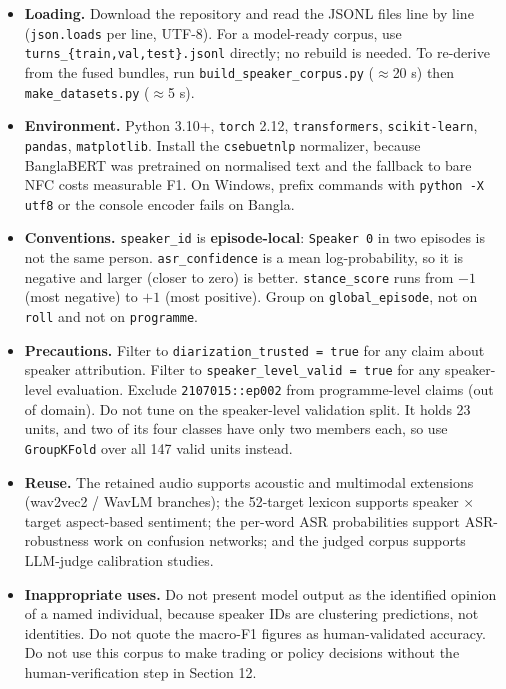 \documentclass[11pt,a4paper]{article}
\begin{document}
\begin{itemize}[leftmargin=1.4em,itemsep=3pt,topsep=2pt]
  \item \textbf{Loading.} Download the repository and read the JSONL files line by line
        (\texttt{json.loads} per line, UTF-8). For a model-ready corpus, use
        \texttt{turns\_\{train,val,test\}.jsonl} directly; no rebuild is needed. To re-derive
        from the fused bundles, run \texttt{build\_speaker\_corpus.py} ($\approx$20 s) then
        \texttt{make\_datasets.py} ($\approx$5 s).
  \item \textbf{Environment.} Python 3.10+, \texttt{torch} 2.12, \texttt{transformers},
        \texttt{scikit-learn}, \texttt{pandas}, \texttt{matplotlib}. Install the
        \texttt{csebuetnlp} normalizer, because BanglaBERT was pretrained on normalised text and the
        fallback to bare NFC costs measurable F1. On Windows, prefix commands with
        \texttt{python -X utf8} or the console encoder fails on Bangla.
  \item \textbf{Conventions.} \texttt{speaker\_id} is \textbf{episode-local}: \texttt{Speaker 0} in
        two episodes is not the same person. \texttt{asr\_confidence} is a mean log-probability, so
        it is negative and larger (closer to zero) is better. \texttt{stance\_score} runs from
        $-1$ (most negative) to $+1$ (most positive). Group on \texttt{global\_episode}, not on
        \texttt{roll} and not on \texttt{programme}.
  \item \textbf{Precautions.} Filter to \texttt{diarization\_trusted = true} for any claim about
        speaker attribution. Filter to \texttt{speaker\_level\_valid = true} for any speaker-level
        evaluation. Exclude \texttt{2107015::ep002} from programme-level claims (out of domain).
        Do not tune on the speaker-level validation split. It holds 23 units, and two of its
        four classes have only two members each, so use \texttt{GroupKFold} over all 147 valid
        units instead.
  \item \textbf{Reuse.} The retained audio supports acoustic and multimodal extensions (wav2vec2 /
        WavLM branches); the 52-target lexicon supports speaker $\times$ target aspect-based
        sentiment; the per-word ASR probabilities support ASR-robustness work on confusion
        networks; and the judged corpus supports LLM-judge calibration studies.
  \item \textbf{Inappropriate uses.} Do not present model output as the identified opinion of a
        named individual, because speaker IDs are clustering predictions, not identities. Do not quote
        the macro-F1 figures as human-validated accuracy. Do not use this corpus to make trading or
        policy decisions without the human-verification step in Section 12.
\end{itemize}
\end{document}
